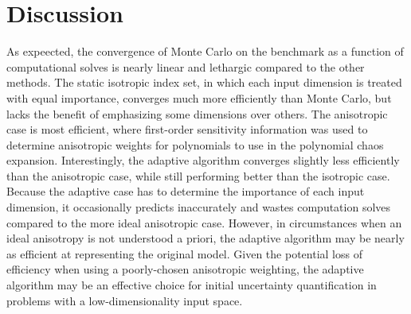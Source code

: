 \documentclass{anstrans} \usepackage{amsmath} \usepackage{amssymb}
\begin{document}
\section{Discussion}
As expeected, the convergence of Monte Carlo on the benchmark as a function of computational solves is nearly
linear and lethargic compared to the other methods.  The static isotropic index set, in which each input
dimension is treated with equal importance, converges much more efficiently than Monte Carlo, but lacks the
benefit of emphasizing some dimensions over others.  The anisotropic case is most efficient, where first-order
sensitivity information was used to determine anisotropic weights for polynomials to use in the polynomial
chaos expansion.  
Interestingly, the adaptive algorithm converges slightly less efficiently than the anisotropic case, while
still performing better than the isotropic case.  Because the adaptive case has to determine the importance of
each input dimension, it occasionally predicts inaccurately and wastes computation solves compared to the more
ideal anisotropic case.  However, in circumstances when an ideal anisotropy is not understood a priori, the
adaptive algorithm may be nearly as efficient at representing the original model.  Given the potential loss of
efficiency when using a poorly-chosen anisotropic weighting, the adaptive algorithm may be an effective choice
for initial uncertainty quantification in problems with a low-dimensionality input space.

{}  
\end{document}
